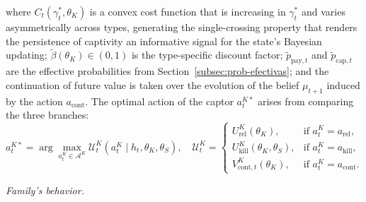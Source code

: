 \documentclass[review,authoryear,12pt]{elsarticle}
\theoremstyle{plain}
\theoremstyle{definition}
\newcommand{\1}{\mathbf{1}}
\begin{document}
where $C_t(\gamma_t^\ast,\theta_K)$ is a convex cost function that is increasing in $\gamma_t^\ast$ and varies asymmetrically across types, generating the single-crossing property that renders the persistence of captivity an informative signal for the state's Bayesian updating; $\tilde{\beta}(\theta_K)\in(0,1)$ is the type-specific discount factor; $\tilde{p}_{\mathrm{pay},t}$ and $\tilde{p}_{\mathrm{cap},t}$ are the effective probabilities from Section~\ref{subsec:prob-efectivas}; and the continuation of future value is taken over the evolution of the belief $\mu_{t+1}$ induced by the action $a_{\mathrm{cont}}$. The optimal action of the captor $a_t^{K\ast}$ arises from comparing the three branches:
\begin{equation}
a_t^{K\ast}=\arg\max_{a_t^K\in\mathcal{A}^K}\mathcal{U}^K_t(a_t^K\mid h_t,\theta_K,\theta_S),\quad
\mathcal{U}^K_t=\begin{cases}U^K_{\mathrm{rel}}(\theta_K), & \text{if }a_t^K=a_{\mathrm{rel}},\\U^K_{\mathrm{kill}}(\theta_K,\theta_S), & \text{if }a_t^K=a_{\mathrm{kill}},\\V^K_{\mathrm{cont},t}(\theta_K), & \text{if }a_t^K=a_{\mathrm{cont}}.\end{cases}
\label{eq:k-argmax}
\end{equation}

\noindent\textit{Family's behavior.}
\end{document}
